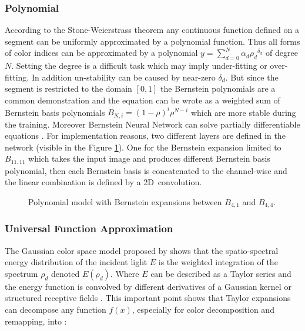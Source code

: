 \documentclass[../thesis.tex]{subfiles}
\begin{document}
	\subsubsection{Polynomial} According to the Stone-Weierstrass theorem any continuous function defined on a segment can be uniformly approximated by a polynomial function. Thus all forms of color indices can be approximated by a polynomial $y = \sum_{d=0}^{N}{\alpha_d \rho_d}^{\delta_d}$ of degree $N$. Setting the degree is a difficult task which may imply under-fitting or over-fitting. In addition un-stability can be caused by near-zero $\delta_d$. But since the segment is restricted to the domain $[0,1]$ the Bernstein polynomials are a common demonstration and the equation can be wrote as a weighted sum of Bernstein basis polynomials $B_{N,i} = (1-\rho)^{i} \rho^{N-i}$ which are more stable during the training. Moreover Bernstein Neural Network can solve partially differentiable equations \cite{Sun2018SolvingPD}. For implementation reasons, two different layers are defined in the network (visible in the Figure \ref{fig:polynomial}). One for the Bernstein expansion limited to $B_{11,11}$ which takes the input image and produces different Bernstein basis polynomial, then each Bernstein basis is concatenated to the channel-wise and the linear combination is defined by a \mbox{2D convolution.}
	
	\begin{figure}[H]
		\centering
		
		\caption{ {Polynomial} model with Bernstein expansions between $B_{4,1}$ and $B_{4,4}$.}
		\label{fig:polynomial}
	\end{figure}%
	
	
	\subsubsection{Universal Function Approximation} The Gaussian color space model proposed by \cite{Geusebroek2000} shows that the spatio-spectral energy distribution of the incident light $E$ is the weighted integration of the spectrum $\rho_d$ denoted $E(\rho_d)$. Where $E$ can be described as a Taylor series and the energy function is convolved by different derivatives of a Gaussian kernel or structured receptive fields \cite{ReceptiveField}. This important point shows that Taylor expansions can decompose any function $f(x)$, especially for color decomposition and remapping, into :
	
\end{document}
